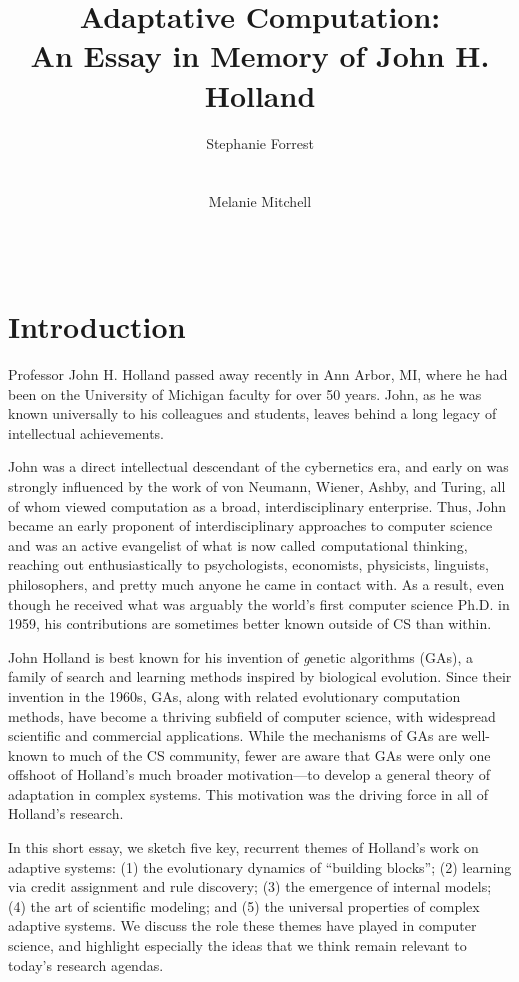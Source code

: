 \documentclass{sig-alternate}
\title{Adaptative Computation:\\ An Essay in Memory of John H. Holland}
\author 
{\alignauthor
 Stephanie Forrest\\
 \affaddr{University of New Mexico}\\
 \affaddr{Santa Fe Institute}\\
 \email{forrest@cs.unm.edu}
 \alignauthor
Melanie Mitchell \\
 \affaddr{Portland State University}\\
 \affaddr{Santa Fe Institute}\\
 \email{mm@pdx.edu}
}
\begin{document}
\maketitle

% 

\section{Introduction}

Professor John H. Holland passed away recently in Ann Arbor, MI, where
he had been on the University of Michigan faculty for over 50 years.
John, as he was known universally to his colleagues and students,
leaves behind a long legacy of intellectual achievements.  

John was a direct intellectual descendant of the cybernetics era, and
early on was strongly influenced by the work of von Neumann, Wiener,
Ashby, and Turing, all of whom viewed computation as a broad,
interdisciplinary enterprise.  Thus, John became an early proponent of
interdisciplinary approaches to computer science and was an active
evangelist of what is now called {\emph computational thinking}, reaching out
enthusiastically to psychologists, economists, physicists, linguists,
philosophers, and pretty much anyone he came in contact with.  As a
result, even though he received what was arguably the world's first
computer science Ph.D. in 1959, his contributions are sometimes better known
outside of CS than within.

John Holland is best known for his invention of {\emph genetic
  algorithms} (GAs), a family of search and learning methods inspired
by biological evolution.  Since their invention in the 1960s, GAs,
along with related evolutionary computation methods, have become a
thriving subfield of computer science, with widespread scientific and
commercial applications.  While the mechanisms of GAs are well-known
to much of the CS community, fewer are aware that GAs were only one
offshoot of Holland's much broader motivation---to develop a general
theory of adaptation in complex systems.  This motivation was the
driving force in all of Holland's research.   

In this short essay, we sketch five key, recurrent themes of Holland's
work on adaptive systems: (1) the evolutionary dynamics of ``building
blocks''; (2) learning via credit assignment and rule discovery; (3)
the emergence of internal models; (4) the art of scientific modeling;
and (5) the universal properties of complex adaptive systems.  We
discuss the role these themes have played in computer science, and
highlight especially the ideas that we think remain relevant to
today's research agendas.
\end{document}

